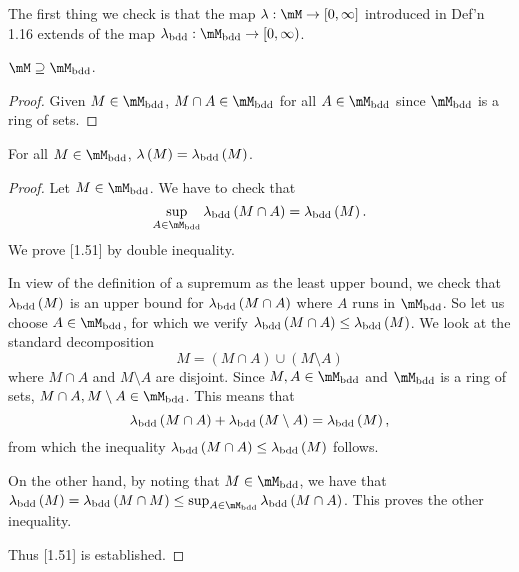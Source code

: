 \documentclass[pmath450]{subfiles}
\begin{document}
    \np The first thing we check is that the map $\lambda:\mM\to\left[ 0,\infty \right]$ introduced in Def'n 1.16 extends of the map $\lambda_{\bdd}:\mM_{\bdd}\to\left[ 0,\infty \right)$.

    \clearpage
    \begin{prop}{}
        $\mM\supseteq\mM_{\bdd}$.
    \end{prop}

    \begin{proof}
        Given $M\in\mM_{\bdd}$, $M\cap A\in\mM_{\bdd}$ for all $A\in\mM_{\bdd}$ since $\mM_{\bdd}$ is a ring of sets.
    \end{proof}

    \begin{prop}{}
        For all $M\in\mM_{\bdd}$, $\lambda\left( M \right)=\lambda_{\operatorname{bdd}}\left( M \right)$.
    \end{prop}

    \begin{proof}
        Let $M\in\mM_{\bdd}$. We have to check that
        \begin{equation}
            \sup_{A\in\mM_{\bdd}}\lambda_{\bdd}\left( M\cap A \right) = \lambda_{\bdd}\left( M \right).
        \end{equation}
        We prove [1.51] by double inequality.

        In view of the definition of a supremum as the least upper bound, we check that $\lambda_{\operatorname{bdd}}\left( M \right)$ is an upper bound for $\lambda_{\operatorname{bdd}}\left( M\cap A \right)$ where $A$ runs in $\mM_{\bdd}$. So let us choose $A\in\mM_{\bdd}$, for which we verify $\lambda_{\operatorname{bdd}}\left( M\cap A \right)\leq\lambda_{\operatorname{bdd}}\left( M \right)$. We look at the standard decomposition
        \begin{equation*}
            M = \left( M\cap A \right)\cup \left( M\setminus A \right)
        \end{equation*}
        where $M\cap A$ and $M\setminus A$ are disjoint. Since $M,A\in\mM_{\bdd}$ and $\mM_{\bdd}$ is a ring of sets, $M\cap A, M\setminus A\in\mM_{\bdd}$. This means that
        \begin{equation*}
            \lambda_{\operatorname{bdd}}\left( M\cap A \right)+\lambda_{\operatorname{bdd}}\left( M\setminus A \right) = \lambda_{\operatorname{bdd}}\left( M \right),
        \end{equation*}
        from which the inequality $\lambda_{\operatorname{bdd}}\left( M\cap A \right)\leq\lambda_{\operatorname{bdd}}\left( M \right)$ follows. 

        On the other hand, by noting that $M\in\mM_{\bdd}$, we have that $\lambda_{\bdd}\left( M \right)=\lambda_{\bdd}\left( M\cap M \right) \leq \sup_{A\in\mM_{\bdd}}\lambda_{\bdd}\left( M\cap A \right)$. This proves the other inequality.

        Thus [1.51] is established.
    \end{proof}
\end{document}
